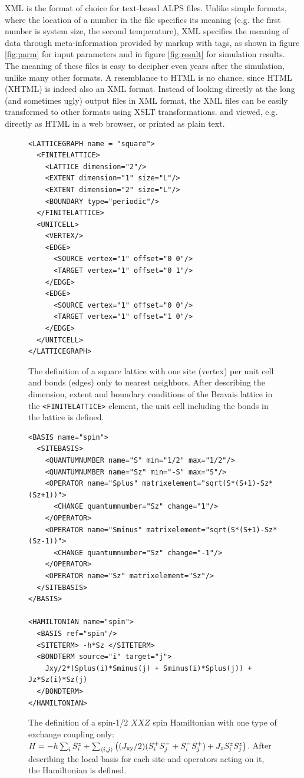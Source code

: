 \documentclass[12pt]{iopart}
\begin{document}
XML is the format of choice for text-based ALPS files. Unlike simple formats, where the location of a number in the file specifies its meaning (e.g. the first number is system size, the second temperature), XML specifies the meaning of data through meta-information provided by markup with tags, as shown in figure \ref{fig:parm} for input parameters and in  figure \ref{fig:result} for simulation results. The meaning of these files is easy to decipher even years after the simulation, unlike many other formats. A resemblance to HTML is no chance, since HTML (XHTML) is indeed also an XML format. Instead of looking directly at the long (and sometimes ugly) output files in XML format, the XML files can be easily transformed to other formats using XSLT transformations.\cite{xslt} and viewed, e.g. directly as HTML in a web browser, or printed as plain text. 

\begin{figure}
\begin{lstlisting}
<LATTICEGRAPH name = "square">
  <FINITELATTICE>
    <LATTICE dimension="2"/>  
    <EXTENT dimension="1" size="L"/>
    <EXTENT dimension="2" size="L"/>
    <BOUNDARY type="periodic"/>  
  </FINITELATTICE>
  <UNITCELL>
    <VERTEX/>
    <EDGE>
      <SOURCE vertex="1" offset="0 0"/>
      <TARGET vertex="1" offset="0 1"/>
    </EDGE>
    <EDGE>
      <SOURCE vertex="1" offset="0 0"/>
      <TARGET vertex="1" offset="1 0"/>
    </EDGE>
  </UNITCELL> 
</LATTICEGRAPH>
\end{lstlisting}
\caption{The definition of a square lattice with one site (vertex) per unit cell and bonds (edges) only to nearest neighbors. After describing the dimension, extent and boundary conditions of the Bravais lattice in the {\tt <FINITELATTICE>} element, the unit cell including the bonds in the lattice is defined.}
\label{fig:lattice}
\end{figure}
\begin{figure}
\begin{lstlisting}
<BASIS name="spin">
  <SITEBASIS>
    <QUANTUMNUMBER name="S" min="1/2" max="1/2"/>
    <QUANTUMNUMBER name="Sz" min="-S" max="S"/>
    <OPERATOR name="Splus" matrixelement="sqrt(S*(S+1)-Sz*(Sz+1))">   
      <CHANGE quantumnumber="Sz" change="1"/>
    </OPERATOR>
    <OPERATOR name="Sminus" matrixelement="sqrt(S*(S+1)-Sz*(Sz-1))">  
      <CHANGE quantumnumber="Sz" change="-1"/>
    </OPERATOR>
    <OPERATOR name="Sz" matrixelement="Sz"/>  
  </SITEBASIS>
</BASIS>

<HAMILTONIAN name="spin">
  <BASIS ref="spin"/>
  <SITETERM> -h*Sz </SITETERM>   
  <BONDTERM source="i" target="j">
    Jxy/2*(Splus(i)*Sminus(j) + Sminus(i)*Splus(j)) + Jz*Sz(i)*Sz(j)
  </BONDTERM>
</HAMILTONIAN>
\end{lstlisting}
\caption{The definition of a spin-1/2 $XXZ$ spin Hamiltonian with one type of exchange coupling only: $H=-h\sum_iS_i^z+\sum_{\langle i,j\rangle} \left((J_{\rm xy}/2)(S_i^+S_j^-+S_i^-S_j^+)+J_zS_i^zS_j^z\right)$.  After describing the local basis for each site and operators acting on it, the Hamiltonian is defined.}
\label{fig:model}
\end{figure}
\end{document}
